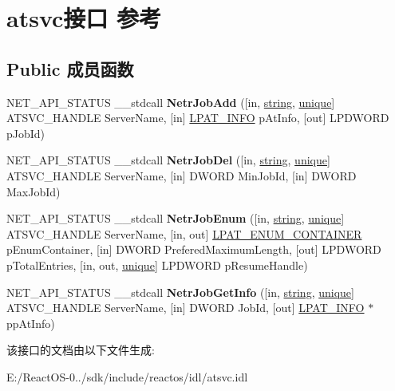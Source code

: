 \hypertarget{interfaceatsvc}{}\section{atsvc接口 参考}
\label{interfaceatsvc}
\subsection*{Public 成员函数}
\begin{DoxyCompactItemize}
\item 
\mbox{\label{interfaceatsvc_a08d3fe48abf8b5f2247d9725a15386c1}} 
N\+E\+T\+\_\+\+A\+P\+I\+\_\+\+S\+T\+A\+T\+US \+\_\+\+\_\+stdcall {\bfseries Netr\+Job\+Add} (\mbox{[}in, \hyperlink{structstring}{string}, \hyperlink{interfaceunique}{unique}\mbox{]} A\+T\+S\+V\+C\+\_\+\+H\+A\+N\+D\+LE Server\+Name, \mbox{[}in\mbox{]} \hyperlink{struct___a_t___i_n_f_o}{L\+P\+A\+T\+\_\+\+I\+N\+FO} p\+At\+Info, \mbox{[}out\mbox{]} L\+P\+D\+W\+O\+RD p\+Job\+Id)
\item 
\mbox{\label{interfaceatsvc_a3412de240f6d56cedcebd142c0eabf38}} 
N\+E\+T\+\_\+\+A\+P\+I\+\_\+\+S\+T\+A\+T\+US \+\_\+\+\_\+stdcall {\bfseries Netr\+Job\+Del} (\mbox{[}in, \hyperlink{structstring}{string}, \hyperlink{interfaceunique}{unique}\mbox{]} A\+T\+S\+V\+C\+\_\+\+H\+A\+N\+D\+LE Server\+Name, \mbox{[}in\mbox{]} D\+W\+O\+RD Min\+Job\+Id, \mbox{[}in\mbox{]} D\+W\+O\+RD Max\+Job\+Id)
\item 
\mbox{\label{interfaceatsvc_abb2a9ef8eaf21245690559d8e658f19b}} 
N\+E\+T\+\_\+\+A\+P\+I\+\_\+\+S\+T\+A\+T\+US \+\_\+\+\_\+stdcall {\bfseries Netr\+Job\+Enum} (\mbox{[}in, \hyperlink{structstring}{string}, \hyperlink{interfaceunique}{unique}\mbox{]} A\+T\+S\+V\+C\+\_\+\+H\+A\+N\+D\+LE Server\+Name, \mbox{[}in, out\mbox{]} \hyperlink{struct___a_t___e_n_u_m___c_o_n_t_a_i_n_e_r}{L\+P\+A\+T\+\_\+\+E\+N\+U\+M\+\_\+\+C\+O\+N\+T\+A\+I\+N\+ER} p\+Enum\+Container, \mbox{[}in\mbox{]} D\+W\+O\+RD Prefered\+Maximum\+Length, \mbox{[}out\mbox{]} L\+P\+D\+W\+O\+RD p\+Total\+Entries, \mbox{[}in, out, \hyperlink{interfaceunique}{unique}\mbox{]} L\+P\+D\+W\+O\+RD p\+Resume\+Handle)
\item 
\mbox{\label{interfaceatsvc_afa6792be80b1ed4b405cca530b9705ef}} 
N\+E\+T\+\_\+\+A\+P\+I\+\_\+\+S\+T\+A\+T\+US \+\_\+\+\_\+stdcall {\bfseries Netr\+Job\+Get\+Info} (\mbox{[}in, \hyperlink{structstring}{string}, \hyperlink{interfaceunique}{unique}\mbox{]} A\+T\+S\+V\+C\+\_\+\+H\+A\+N\+D\+LE Server\+Name, \mbox{[}in\mbox{]} D\+W\+O\+RD Job\+Id, \mbox{[}out\mbox{]} \hyperlink{struct___a_t___i_n_f_o}{L\+P\+A\+T\+\_\+\+I\+N\+FO} $\ast$pp\+At\+Info)
\end{DoxyCompactItemize}


该接口的文档由以下文件生成\+:\begin{DoxyCompactItemize}
\item 
E\+:/\+React\+O\+S-\/0../sdk/include/reactos/idl/atsvc.\+idl\end{DoxyCompactItemize}
